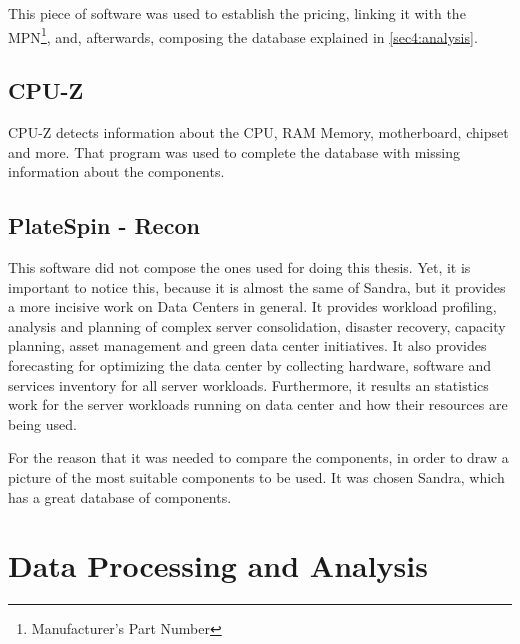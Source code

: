    This piece of software was used to establish the pricing, linking it with the MPN\footnote{Manufacturer's Part Number}, and, afterwards, composing the database explained in \ref{sec4:analysis}. 
\subsection{CPU-Z} \label{sec3:cpu-z}
    CPU-Z detects information about the CPU, RAM Memory, motherboard, chipset and more. That program was used to complete the database with missing information about the components.
\subsection{PlateSpin - Recon} \label{sec3:power_recon}
    This software did not compose the ones used for doing this thesis. Yet, it is important to notice this, because it is almost the same of Sandra, but it provides a more incisive work on Data Centers in general. It provides workload profiling, analysis and planning of complex server consolidation, disaster recovery, capacity planning, asset management and green data center initiatives. It also provides forecasting for optimizing the data center by collecting hardware, software and services inventory for all server workloads. Furthermore, it results an statistics work for the server workloads running on data center and how their resources are being used.
    
    For the reason that it was needed to compare the components, in order to draw a picture of the most suitable components to be used. It was chosen Sandra, which has a great database of components.

\section{Data Processing and Analysis} \label{sec3:data_processing_analysis}
